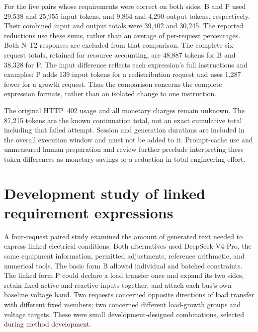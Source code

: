 For the five pairs whose requirements were correct on both sides, B and P used 29,538 and 25,955 input tokens, and 9,864 and 4,290 output tokens, respectively. Their combined input and output totals were 39,402 and 30,245. The reported reductions use these sums, rather than an average of per-request percentages. Both N-T2 responses are excluded from that comparison. The complete six-request totals, retained for resource accounting, are 48,887 tokens for B and 38,328 for P. The input difference reflects each expression's full instructions and examples: P adds 139 input tokens for a redistribution request and uses 1,287 fewer for a growth request. Thus the comparison concerns the complete expression formats, rather than an isolated change to one instruction.

The original HTTP~402 usage and all monetary charges remain unknown. The 87,215 tokens are the known continuation total, not an exact cumulative total including that failed attempt. Session and generation durations are included in the overall execution window and must not be added to it. Prompt-cache use and unmeasured human preparation and review further preclude interpreting these token differences as monetary savings or a reduction in total engineering effort.

\section{Development study of linked requirement expressions}
\label{app:development-pairs}

A four-request paired study examined the amount of generated text needed to express linked electrical conditions. Both alternatives used DeepSeek-V4-Pro, the same equipment information, permitted adjustments, reference arithmetic, and numerical tools. The basic form B allowed individual and batched constraints. The linked form P could declare a load transfer once and expand its two sides, retain fixed active and reactive inputs together, and attach each bus's own baseline voltage band. Two requests concerned opposite directions of load transfer with different fixed members; two concerned different load-growth groups and voltage targets. These were small development-designed combinations, selected during method development.

